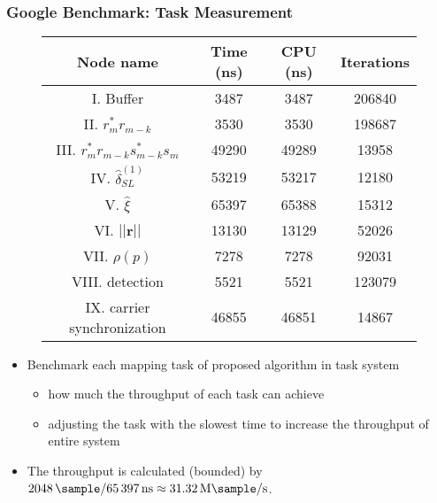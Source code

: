   \begin{frame}
    \frametitle{Google Benchmark: Task Measurement}

    \begin{figure}
        \centering
        \begin{table}[t]
          \tiny
          \centering %
          \begin{tabular}{c c c c} %
          \hline\hline %
          Node name & Time (ns) & CPU (ns) & Iterations \\ [0.5ex] %
          \hline %
          I. Buffer  & 3487 & 3487 & 206840 \\ %
          II. $r_m^*r_{m-k}$  & 3530 & 3530 & 198687 \\
          III. $r_m^*r_{m-k}s_{m-k}^*s_m$ & 49290 & 49289 & 13958 \\
          IV. $\hat{\delta}_{SL}^{(1)}$ & 53219 & 53217 & 12180 \\
          V. $\hat{\xi}$ & 65397 & 65388 & 15312 \\
          VI. $||\bm{r}||$ & 13130 & 13129 & 52026 \\ %
          VII. $\rho(p)$ & 7278 & 7278 & 92031 \\
          VIII. detection & 5521 & 5521 & 123079 \\
          IX. carrier synchronization & 46855 & 46851 & 14867  \\ [1ex]
          \hline
          \end{tabular}
          \label{table:BM_function_nodes} %
        \end{table}   
    \end{figure}

    \begin{itemize}
       \item Benchmark each mapping task of proposed algorithm in task system
       \begin{itemize}
        \item how much the throughput of each task can achieve
        \item adjusting the task with the slowest time to increase the throughput of entire system
       \end{itemize}
       \item The throughput is calculated (bounded) by $\SI{2048}{\sample}/\SI{65397}{\nano\second}  \approx \SI[per-mode=symbol]{31.32}{\mega\sample\per\second}$.
    \end{itemize}
  \end{frame}

